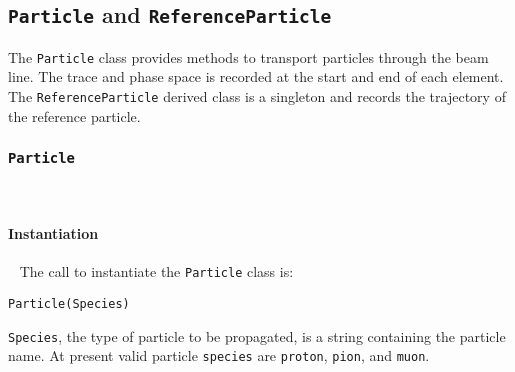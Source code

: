 \FloatBarrier

\pagebreak

\subsection{\texttt{Particle} and \texttt{ReferenceParticle}}
\label{SubSect:BLE:ParticleReferenceParticle}

The \texttt{Particle} class provides methods to transport particles
through the beam line.
The trace and phase space is recorded at the start and end of each
element.
The \texttt{ReferenceParticle} derived class is a singleton and
records the trajectory of the reference particle.

\subsubsection{\texttt{Particle}} ~\newline
\label{SubSubSect:BLE:Particle}

\paragraph{Instantiation}  ~\newline
\noindent
The call to instantiate the \texttt{Particle} class is:
\begin{center}
  \texttt{Particle(Species)}
\end{center}
\texttt{Species}, the type of particle to be propagated, is a string
containing the particle name.
At present valid particle \texttt{species} are
\texttt{proton}, \texttt{pion}, and \texttt{muon}.

